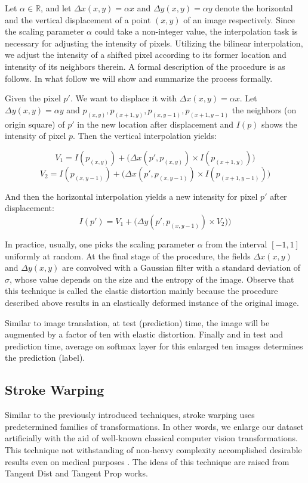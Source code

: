 Let $\alpha \in \mathbb{R}$, and let $\Delta x(x,  y) = \alpha x$ and $\Delta y(x,  y) = \alpha y$
denote the horizontal and the vertical displacement of a point $(x, y)$ of an image respectively.
Since the scaling parameter $\alpha$ could take a non-integer value, the interpolation task is
necessary for adjusting the intensity of pixels. Utilizing the bilinear interpolation, we adjust the
intensity of a shifted pixel according to its former location and intensity of its neighbors
therein. A formal description of the procedure is as follows. In what follow we will show and summarize the
process formally.

\begin{definition}{}
  Given the pixel $p'$. We want to displace it with $\Delta x(x,y)= \alpha x$. Let $\Delta y(x,y)= \alpha y$ and $p_{(x,y)}, p_{(x+1,y)}, p_{(x,y-1)}, p_{(x+1,y-1)}$ the neighbors (on
  origin square) of $p'$ in the new location after displacement and $I(p)$ shows the intensity of pixel $p$. Then the vertical interpolation yields:

  $$V_1 = I(p_{(x,y)}) + \big( \Delta x(p', p_{(x,y)}) \times I(p_{(x+1,y)}) \big)$$
  $$V_2 = I(p_{(x,y-1)}) + \big( \Delta x(p', p_{(x,y-1)}) \times I(p_{(x+1,y-1)}) \big)$$

  And then the horizontal interpolation yields a new intensity for pixel $p'$ after displacement:
  $$I(p') = V_1 + \big( \Delta y(p', p_{(x,y-1)}) \times V_2) \big)$$
\end{definition}

In practice, usually, one picks the scaling parameter $\alpha$ from the interval $[-1, 1]$ uniformly
at random. At the final stage of the procedure, the fields  $\Delta x(x,  y)$ and $\Delta y(x,  y)$
are convolved with a Gaussian filter with a standard deviation of $\sigma$, whose value depends on
the size and the entropy of the image. Observe that this technique is called the elastic distortion
mainly because the procedure described above results in an elastically deformed instance
of the original image.

Similar to image translation, at test (prediction) time, the image will be augmented by a factor of
ten with elastic distortion. Finally and in test and prediction time, average on softmax layer for
this enlarged ten images determines the prediction (label).

\subsection{Stroke Warping}
\label{tit:stroke-warping}
Similar to the previously introduced techniques, stroke warping uses predetermined families of transformations.
In other words, we enlarge our dataset artificially with the aid of well-known classical computer
vision transformations. This technique not withstanding of non-heavy complexity accomplished desirable
results even on medical purposes \cite{stroke_tumor}. The ideas of this technique are raised from Tangent
Dist \cite{stroke_idea_1992} and Tangent Prop \cite{stroke_idea_1993} works.

